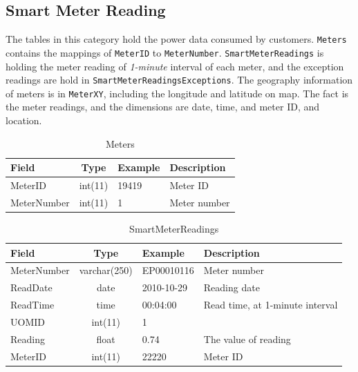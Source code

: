 \documentclass[a4paper,12pt]{llncs}
\begin{document}
\newpage
\subsection{Smart Meter Reading}
The tables in this category hold the power data consumed by customers.  \texttt{Meters} contains the mappings of  \texttt{MeterID} to \texttt{MeterNumber}.  \texttt{SmartMeterReadings} is holding the meter reading of {\em 1-minute} interval of each  meter, and the exception readings are hold in \texttt{SmartMeterReadingsExceptions}. The geography information of meters is  in  \texttt{MeterXY}, including the longitude and latitude on map. The fact is the meter readings, and the dimensions are date, time, and  meter ID, and location.
\begin{table}[htp]
\centering
\caption{Meters}
\begin{tabular}{|l|c|l|p{10cm}|}
 \hline
 {\bf Field}       & {\bf Type} & {\bf Example}     & {\bf Description } \\ \hline
MeterID    &int(11)& 19419&  Meter ID \\ \hline
MeterNumber&int(11)& 1&  Meter number \\ \hline
\end{tabular}
\end{table}
\begin{table}[htp]
\centering
\caption{SmartMeterReadings}
\begin{tabular}{|l|c|l|p{9cm}|}
 \hline
 {\bf Field}       & {\bf Type} & {\bf Example}     & {\bf Description } \\ \hline
MeterNumber&varchar(250)&EP00010116 & Meter number  \\ \hline
ReadDate   &date        &2010-10-29&  Reading date \\ \hline
ReadTime   &time        &00:04:00 &  Read time, at 1-minute interval \\ \hline
UOMID      &int(11)     &1 &   \\ \hline
Reading    &float       &0.74 &  The value of reading \\ \hline
MeterID    &int(11)     &22220 &  Meter ID \\ \hline
\end{tabular}
\end{table}
\end{document}
